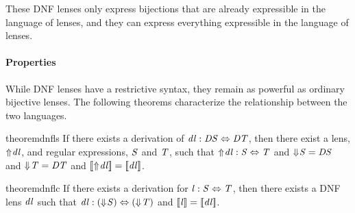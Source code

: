\documentclass[acmsmall]{acmart}
\begin{document}
\iffull
These DNF lenses only express bijections that are already expressible in the
language of lenses, and they can express everything expressible in the
language of lenses.
\fi

\paragraph*{Properties}  While DNF lenses have a restrictive syntax, they
remain as powerful as ordinary bijective lenses.  The following theorems
characterize the relationship between the two languages.

\begin{restatable}{theorem}{dnfls}
  \label{thm:dnfls}
  If there exists a derivation of $\mathit{dl} : \mathit{DS} \Leftrightarrow \mathit{DT}$,
  then there exist a lens, $\Uparrow{}\mkern-4mu \mathit{dl}$, and regular expressions, $\mathit{S}$ and 
$\mathit{T}$, such that $\Uparrow{}\mkern-4mu \mathit{dl} : \mathit{S} \Leftrightarrow \mathit{T}$ and
  $\Downarrow\mkern-4mu \mathit{S}=\mathit{DS}$ and
  $\Downarrow\mkern-4mu \mathit{T}=\mathit{DT}$ and
  $[ \! [\Uparrow{}\mkern-4mu \mathit{dl}] \! ]=[ \! [\mathit{dl}] \! ]$.
\end{restatable}

\begin{restatable}{theorem}{dnflc}
  \label{thm:dnflc}
  If there exists a derivation for $\mathit{l} : \mathit{S} \Leftrightarrow
  \mathit{T}$,
  then there exists a DNF lens $\mathit{dl}$ such that
  $\mathit{dl} : (\Downarrow\mkern-4mu \mathit{S}) \Leftrightarrow (\Downarrow\mkern-4mu \mathit{T})$ and $[ \! [\mathit{l}] \! ]=[ \! [\mathit{dl}] \! ]$.
\end{restatable}
\end{document}
